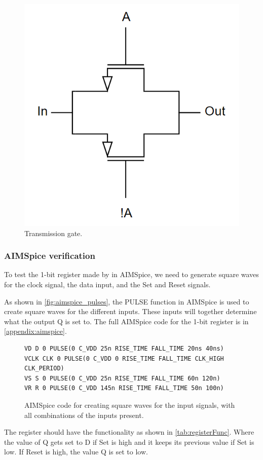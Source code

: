 \begin{figure}[H]
    \centering
    \includegraphics[width=0.4\linewidth]{Figures/Transmission gate.png}
    \caption{Transmission gate.}
    \label{fig:TransGate}
\end{figure}


\subsubsection{AIMSpice verification}
\label{subsubsec:aimspice_testing}
To test the 1-bit register made by in AIMSpice, we need to generate square waves for the clock signal, the data input, and the Set and Reset signals.

As shown in \autoref{fig:aimspice_pulses}, the PULSE function in AIMSpice is used to create square waves for the different inputs. These inputs will together determine what the output Q is set to. The full AIMSpice code for the 1-bit register is in \autoref{appendix:aimspice}.

\begin{figure}[H]
\centering
\begin{minipage}{0.9\textwidth}
\begin{lstlisting}[style=aimspiceStyle]
VD D 0 PULSE(0 C_VDD 25n RISE_TIME FALL_TIME 20ns 40ns)
VCLK CLK 0 PULSE(0 C_VDD 0 RISE_TIME FALL_TIME CLK_HIGH CLK_PERIOD)
VS S 0 PULSE(0 C_VDD 25n RISE_TIME FALL_TIME 60n 120n)
VR R 0 PULSE(0 C_VDD 145n RISE_TIME FALL_TIME 50n 100n)
\end{lstlisting}
\end{minipage}
\caption{AIMSpice code for creating square waves for the input signals, with all combinations of the inputs present.}
\label{fig:aimspice_pulses}
\end{figure}

The register should have the functionality as shown in \autoref{tab:registerFunc}. Where the value of Q gets set to D if Set is high and it keeps its previous value if Set is low. If Reset is high, the value Q is set to low. 

